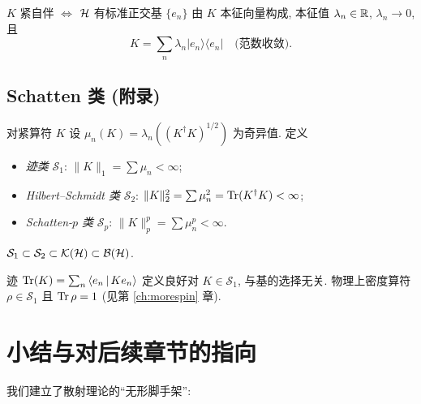 \begin{theorem}\label{thm:hilbert-HS}
$K$ 紧自伴 $\iff$ $\mathcal{H}$ 有标准正交基 $\{e_n\}$ 由 $K$ 本征向量构成, 本征值 $\lambda_n\in\mathbb{R}$, $\lambda_n\to 0$, 且
\begin{equation}\label{eq:hilbert-HSdiag}
K=\sum_n \lambda_n |e_n\rangle\langle e_n|\quad \text{(范数收敛)}.
\end{equation}
\end{theorem}

\subsection{Schatten 类 (附录)}

\begin{definition}\label{def:hilbert-schatten}
对紧算符 $K$ 设 $\mu_n(K)=\lambda_n((K^\dagger K)^{1/2})$ 为奇异值. 定义
\begin{itemize}
    \item \emph{迹类} $\mathcal{S}_1$: $\|K\|_1=\sum\mu_n<\infty$;
    \item \emph{Hilbert--Schmidt 类} $\mathcal{S}_2$: $\|K\|_2^2=\sum\mu_n^2=\operatorname{Tr}(K^\dagger K)<\infty$;
    \item \emph{Schatten-$p$ 类} $\mathcal{S}_p$: $\|K\|_p^p=\sum\mu_n^p<\infty$.
\end{itemize}
$\mathcal{S}_1\subset\mathcal{S}_2\subset\mathcal{K}(\mathcal{H})\subset\mathcal{B}(\mathcal{H})$.
\end{definition}

迹 $\operatorname{Tr}(K)=\sum_n \left\langle e_n \,\middle|\, K e_n \right\rangle$ 定义良好对 $K\in\mathcal{S}_1$, 与基的选择无关. 物理上密度算符 $\rho\in\mathcal{S}_1$ 且 $\operatorname{Tr}\rho=1$ (见第 \ref{ch:morespin} 章).

\section{小结与对后续章节的指向}\label{sec:hilbert-summary}

我们建立了散射理论的``无形脚手架'':

